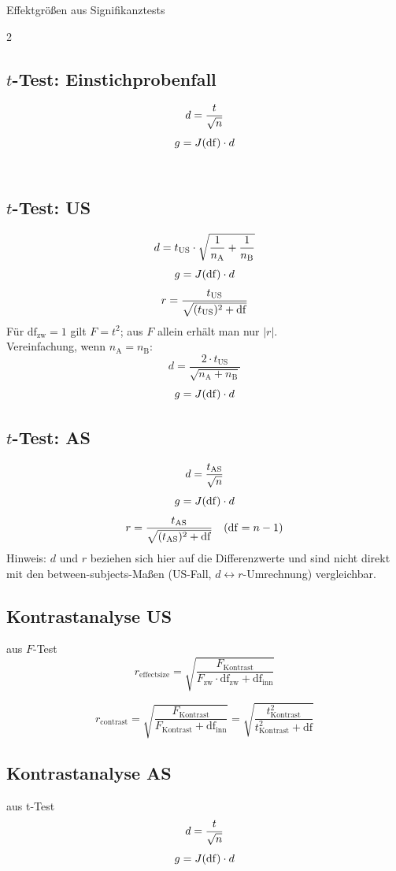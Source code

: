 \begin{formulaBox}{Effektgrößen aus Signifikanztests}{}
\begin{multicols}{2}

\subsection*{$t$-Test: Einstichprobenfall}
$$d=\frac{t}{\sqrt{n}}$$
$$g=J(\mathrm{df})\cdot d$$\\

\subsection*{$t$-Test: US}
$$d=t_\mathrm{US}\cdot\sqrt{\frac{1}{n_\mathrm{A}}+\frac{1}{n_\mathrm{B}}}$$
$$g=J(\mathrm{df})\cdot d$$
$$r=\frac{t_\mathrm{US}}{\sqrt{(t_\mathrm{US})^2+\mathrm{df}}}$$
Für $\mathrm{df}_{\mathrm{zw}}=1$ gilt $F=t^2$; aus $F$ allein erhält man nur $|r|$.\\

Vereinfachung, wenn $n_\mathrm{A}=n_\mathrm{B}$: 
$$d=\frac{2\cdot t_\mathrm{US}}{\sqrt{n_\mathrm{A}+n_\mathrm{B}}}$$
$$g=J(\mathrm{df})\cdot d$$


\subsection*{$t$-Test: AS}
$$d=\frac{t_\mathrm{AS}}{\sqrt{n}}$$
$$g=J(\mathrm{df})\cdot d$$
$$r=\frac{t_\mathrm{AS}}{\sqrt{(t_\mathrm{AS})^2+\mathrm{df}}} \quad (\mathrm{df}=n-1)$$
Hinweis: $d$ und $r$ beziehen sich hier auf die Differenzwerte und sind nicht direkt mit den between-subjects-Maßen (US-Fall, $d\leftrightarrow r$-Umrechnung) vergleichbar.


\subsection*{Kontrastanalyse US}
aus $F$-Test
$$r_{\mathrm{effect size}}=\sqrt{\frac{F_{\mathrm{Kontrast}}}{F_{\mathrm{zw}} \cdot {\mathrm{df}}_{\mathrm{zw}}+{\mathrm{df}}_{\mathrm{inn}}}}$$

$$r_{\mathrm{contrast}} = \sqrt{\frac{F_{\mathrm{Kontrast}}}{F_{\mathrm{Kontrast}}+\mathrm{df_{\mathrm{inn}}}}} = \sqrt{\frac{t^2_{\mathrm{Kontrast}}}{t^2_{\mathrm{Kontrast}}+\mathrm{df}}} $$
\subsection*{Kontrastanalyse AS}
aus t-Test
$$d=\frac{t}{\sqrt{n}}$$
$$g=J(\mathrm{df})\cdot d$$


\end{multicols}
\end{formulaBox}
